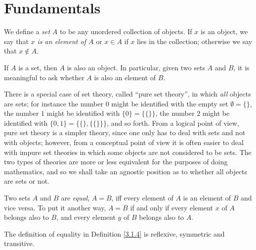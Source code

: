 \section{Fundamentals}\label{sec 3.1}

\begin{definition}\label{3.1.1}
We define a \emph{set} \(A\) to be any unordered collection of objects.
If \(x\) is an object, we say that \emph{\(x\) is an element of \(A\)} or \(x \in A\) if \(x\) lies in the collection;
otherwise we say that \(x \notin A\).
\end{definition}

\begin{axiom}\label{3.1}
If \(A\) is a set, then \(A\) is also an object.
In particular, given two sets \(A\) and \(B\), it is meaningful to ask whether \(A\) is also an element of \(B\).
\end{axiom}

\setcounter{theorem}{2}
\begin{remark}\label{3.1.3}
There is a special case of set theory, called ``pure set theory'', in which \emph{all} objects are sets;
for instance the number \(0\) might be identified with the empty set \(\emptyset = \{\}\), the number \(1\) might be identified with \(\{0\} = \{\{\}\}\), the number \(2\) might be identified with \(\{0, 1\} = \{\{\}, \{\{\}\}\}\), and so forth.
From a logical point of view, pure set theory is a simpler theory, since one only has to deal with sets and not with objects;
however, from a conceptual point of view it is often easier to deal with impure set theories in which some objects are not considered to be sets.
The two types of theories are more or less equivalent for the purposes of doing mathematics, and so we shall take an agnostic position as to whether all objects are sets or not.
\end{remark}

\begin{definition}\label{3.1.4}
Two sets \(A\) and \(B\) are \emph{equal}, \(A = B\), iff every element of \(A\) is an element of \(B\) and vice versa.
To put it another way, \(A = B\) if and only if every element \(x\) of \(A\) belongs also to \(B\), and every element \(y\) of \(B\) belongs also to \(A\).
\end{definition}

\begin{additional corollary}\label{ac 3.1.1}
The definition of equality in Definition \ref{3.1.4} is reflexive, symmetric and transitive.
\end{additional corollary}

